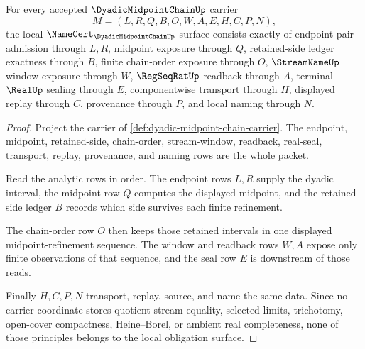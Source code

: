 \begin{theorem}
\label{thm:dyadic-midpoint-chain-namecert-obligations}
For every accepted $\DyadicMidpointChainUp$ carrier
$$
M=(L,R,Q,B,O,W,A,E,H,C,P,N),
$$
the local $\NameCert_{\DyadicMidpointChainUp}$ surface consists exactly of endpoint-pair admission through $L,R$, midpoint exposure through $Q$, retained-side ledger exactness through $B$, finite chain-order exposure through $O$, $\StreamNameUp$ window exposure through $W$, $\RegSeqRatUp$ readback through $A$, terminal $\RealUp$ sealing through $E$, componentwise transport through $H$, displayed replay through $C$, provenance through $P$, and local naming through $N$.
\end{theorem}
\begin{proof}
Project the carrier of \autoref{def:dyadic-midpoint-chain-carrier}. The endpoint, midpoint, retained-side, chain-order, stream-window, readback, real-seal, transport, replay, provenance, and naming rows are the whole packet.

Read the analytic rows in order. The endpoint rows $L,R$ supply the dyadic interval, the midpoint row $Q$ computes the displayed midpoint, and the retained-side ledger $B$ records which side survives each finite refinement.

The chain-order row $O$ then keeps those retained intervals in one displayed midpoint-refinement sequence. The window and readback rows $W,A$ expose only finite observations of that sequence, and the seal row $E$ is downstream of those reads.

Finally $H,C,P,N$ transport, replay, source, and name the same data. Since no carrier coordinate stores quotient stream equality, selected limits, trichotomy, open-cover compactness, Heine--Borel, or ambient real completeness, none of those principles belongs to the local obligation surface.
\end{proof}

